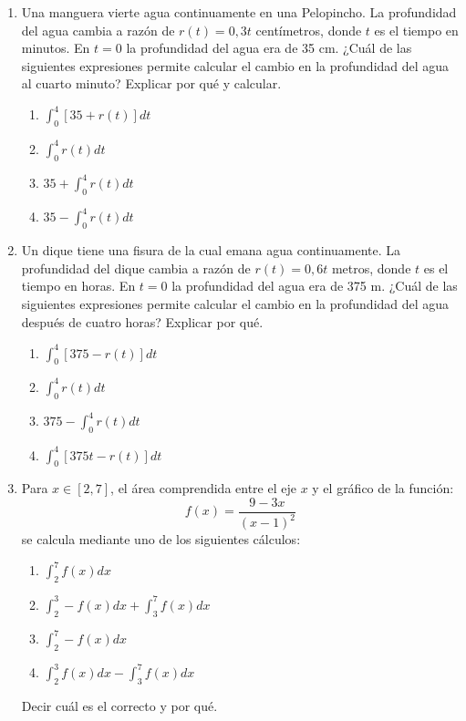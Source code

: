 \documentclass[12pt]{article}
\theoremstyle{definition}
\begin{document}
\begin{enumerate}

\item  
Una manguera vierte agua continuamente en una Pelopincho. La profundidad del agua cambia a razón de $r(t)=0,3t$ centímetros, donde $t$ es el tiempo en minutos. En $t=0$ la profundidad del agua era de 35 cm. ¿Cuál de las siguientes expresiones permite calcular el cambio en la profundidad del agua al cuarto minuto? Explicar por qué y calcular. 
\begin{enumerate}
\item $\int_{0}^{4}[35+r(t)]dt$
\item $\int_{0}^{4} r(t)dt$
\item $35 + \int_{0}^{4} r(t) dt$
\item $35- \int_{0}^{4}r(t) dt$
\end{enumerate}
	
\item  
Un dique tiene una fisura de la cual emana agua continuamente. La profundidad del dique cambia a razón de $r(t)=0,6t$ metros, donde $t$ es el tiempo en horas. En $t= 0$ la profundidad del agua era de 375 m. ¿Cuál de las siguientes expresiones permite calcular el cambio en la profundidad del agua después de cuatro horas? Explicar por qué.
\begin{enumerate}
\item $\int_{0}^{4}[375-r(t)]dt$
\item $\int_{0}^{4} r(t)dt$
\item $375 - \int_{0}^{4} r(t) dt$
\item $\int_{0}^{4}[375t-r(t)]dt$
\end{enumerate}

\item  
Para $x \in[2,7]$, el área comprendida entre  el eje $x$ y el gráfico de la función:
\begin{equation*}
f(x) = \frac{9-3x}{(x-1)^2}
\end{equation*}
se calcula mediante uno de los  siguientes cálculos:
\begin{enumerate}
\item $\int_{2}^{7}f(x)dx$
\item $\int_{2}^{3}-f(x)dx + \int_{3}^{7}f(x)dx$
\item $\int_{2}^{7}-f(x)dx$
\item $\int_{2}^{3}f(x)dx - \int_{3}^{7}f(x)dx$
\end{enumerate}
Decir cuál es el correcto y por qué.


\end{enumerate}
\end{document}

